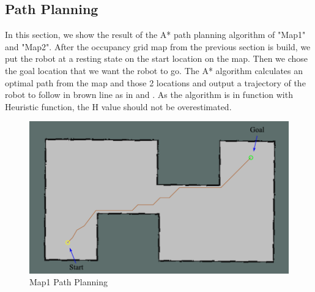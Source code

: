\subsection{Path Planning}
\hspace{1.27cm}
In this section, we show the result of the A* path planning algorithm of "Map1" and "Map2". After the occupancy grid map from the previous section is build, we put the robot at a resting state on the start location on the map. Then we chose the goal location that we want the robot to go. The A* algorithm calculates an optimal path from the map and those 2 locations and output a trajectory of the robot to follow in brown line as in \textbf{\figureautorefname{ \ref{fig:Map1 Path Planning}}} and \textbf{\figureautorefname{ \ref{fig:Map2 Path Planning}}}. As the algorithm is in function with Heuristic function, the H value should not be overestimated.\par



\begin{figure}[H]
	\centering
	\includegraphics[scale=0.80]{images/imagess/7reslt-pp-map1.pdf}
	\caption{Map1 Path Planning}
	\label{fig:Map1 Path Planning}
\end{figure}


